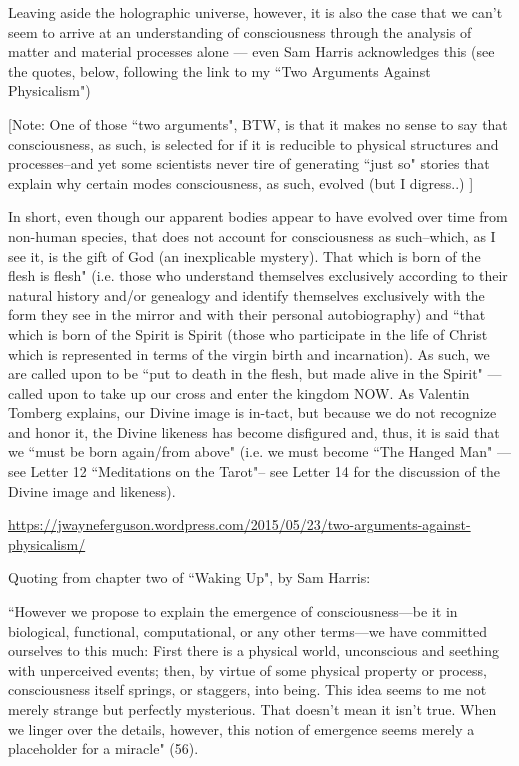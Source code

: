 \begin{footnotesize}
\begin{sffamily}
Leaving aside the holographic universe, however, it is also the case that we can't seem to arrive at an understanding of consciousness through the analysis of matter and material processes alone — even Sam Harris acknowledges this (see the quotes, below, following the link to my ``Two Arguments Against Physicalism") 

[Note: One of those ``two arguments", BTW, is that it makes no sense to say that consciousness, as such, is selected for if it is reducible to physical structures and processes–and yet some scientists never tire of generating ``just so" stories that explain why certain modes consciousness, as such, evolved (but I digress..) ]

In short, even though our apparent bodies appear to have evolved over time from non-human species, that does not account for consciousness as such–which, as I see it, is the gift of God (an inexplicable mystery). That which is born of the flesh is flesh" (i.e. those who understand themselves exclusively according to their natural history and/or genealogy and identify themselves exclusively with the form they see in the mirror and with their personal autobiography) and ``that which is born of the Spirit is Spirit (those who participate in the life of Christ which is represented in terms of the virgin birth and incarnation). As such, we are called upon to be ``put to death in the flesh, but made alive in the Spirit" — called upon to take up our cross and enter the kingdom NOW. As Valentin Tomberg explains, our Divine image is in-tact, but because we do not recognize and honor it, the Divine likeness has become disfigured and, thus, it is said that we ``must be born again/from above" (i.e. we must become ``The Hanged Man" — see Letter 12 ``Meditations on the Tarot"– see Letter 14 for the discussion of the Divine image and likeness).

\url{https://jwayneferguson.wordpress.com/2015/05/23/two-arguments-against-physicalism/}

Quoting from chapter two of ``Waking Up", by Sam Harris:

``However we propose to explain the emergence of consciousness—be it in biological, functional, computational, or any other terms—we have committed ourselves to this much: First there is a physical world, unconscious and seething with unperceived events; then, by virtue of some physical property or process, consciousness itself springs, or staggers, into being. This idea seems to me not merely strange but perfectly mysterious. That doesn't mean it isn't true. When we linger over the details, however, this notion of emergence seems merely a placeholder for a miracle" (56).


\end{sffamily}
\end{footnotesize}
